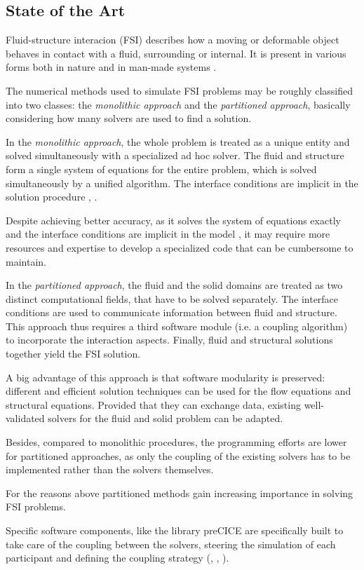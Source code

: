 \subsection*{State of the Art}

Fluid-structure interacion (FSI) describes how a moving or deformable object behaves in contact with a fluid, surrounding or internal. It is present in various forms both in nature and in man-made systems \cite{ZIENKIEWICZ2014423}.

The numerical methods used to simulate FSI problems may be roughly classified into two classes: the \textit{monolithic approach} and the \textit{partitioned approach}, basically considering how many solvers are used to find a solution.

In the \textit{monolithic approach}, the whole problem is treated as a unique entity and solved simultaneously with a specialized ad hoc solver. The fluid and structure form a single system of equations for the entire problem, which is solved simultaneously by a unified algorithm. The interface conditions are implicit in the solution procedure \cite{hubner2004monolithic}, \cite{ryzhakov2010monolithic}.

Despite achieving better accuracy, as it solves the system of equations exactly and the interface conditions are implicit in the model \cite{richter2017fluid}, it may require more resources and expertise to develop a specialized code that can be cumbersome to maintain.

In the \textit{partitioned approach}, the fluid and the solid domains are treated as two distinct computational fields, that have to be solved separately. The interface conditions are used to communicate information between fluid and structure\cite{degroote2009performance}. This approach thus requires a third software module (i.e. a coupling algorithm) to incorporate the interaction aspects. Finally, fluid and structural solutions together yield the FSI solution.

A big advantage of this approach is that software modularity is preserved: different and efficient solution techniques can be used for the flow equations and structural equations. Provided that they can exchange data, existing well-validated solvers for the fluid and solid problem can be adapted.

Besides, compared to monolithic procedures, the programming efforts are lower for partitioned approaches, as only the coupling of the existing solvers has to be implemented rather than the solvers themselves.

For the reasons above partitioned methods gain increasing importance in solving FSI problems. 

Specific software components, like the library preCICE \cite{bungartz2016precice} are specifically built to take care of the coupling between the solvers, steering the simulation of each participant and defining the coupling strategy (\cite{hou2012numerical}, \cite{degroote2009performance}, \cite{mehl2016parallel}). 

